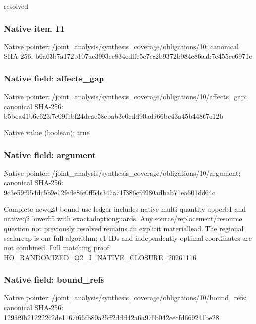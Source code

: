 \documentclass[10pt,a4paper]{article}
\begin{document}
\begingroup\raggedright\sloppy resolved\par\endgroup

\subsubsection{Native item 11}
Native pointer: /joint\_\allowbreak{}analysis/synthesis\_\allowbreak{}coverage/obligations/10; canonical SHA-256: b6a63b7a172b107ac3993cc834edffc5e7cc2b9372b084c86aab7c455ee6971c

\subsubsection{Native field: affects\_\allowbreak{}gap}
Native pointer: /joint\_\allowbreak{}analysis/synthesis\_\allowbreak{}coverage/obligations/10/affects\_\allowbreak{}gap; canonical SHA-256: b5bea41b6c623f7c09f1bf24dcae58ebab3c0cdd90ad966bc43a45b44867e12b

Native value (boolean): true

\subsubsection{Native field: argument}
Native pointer: /joint\_\allowbreak{}analysis/synthesis\_\allowbreak{}coverage/obligations/10/argument; canonical SHA-256: 9c3e59f954dc5b9e12fede8fc0ff54e347a71f386cfd980adbab71ea601dd64c

\begingroup\raggedright\sloppy Complete newq2J bound-use ledger includes native multi-quantity upperb1 and nativeq2 lowerb5 with exactadoptionguards. Any source/\allowbreak{}replacement/\allowbreak{}resource question not previously resolved remains an explicit materiallead. The regional scalarcap is one full algorithm;\allowbreak{} q1 IDs and independently optimal coordinates are not combined. Full matching proof HO\_\allowbreak{}RANDOMIZED\_\allowbreak{}Q2\_\allowbreak{}J\_\allowbreak{}NATIVE\_\allowbreak{}CLOSURE\_\allowbreak{}20261116\par\endgroup

\subsubsection{Native field: bound\_\allowbreak{}refs}
Native pointer: /joint\_\allowbreak{}analysis/synthesis\_\allowbreak{}coverage/obligations/10/bound\_\allowbreak{}refs; canonical SHA-256: 1293f9b21222262de1167f66fb80a25ff2ddd42a6a975b042cecfd669241be28
\end{document}
